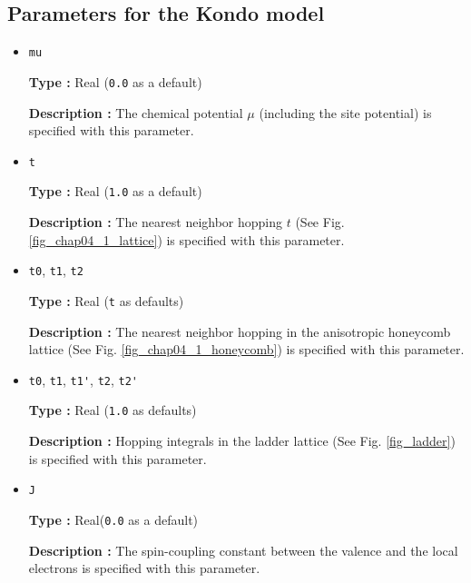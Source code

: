 \subsection{Parameters for the Kondo model}
\begin{itemize}
\item \verb|mu|

{\bf Type :} Real (\verb|0.0| as a default)

{\bf Description :} The chemical potential $\mu$ (including the site potential)
is specified with this parameter.

\item \verb|t|

{\bf Type :} Real (\verb|1.0| as a default)

{\bf Description :} The nearest neighbor hopping $t$ (See Fig. \ref{fig_chap04_1_lattice})
is specified with this parameter.

\item \verb|t0|, \verb|t1|, \verb|t2|

{\bf Type :} Real (\verb|t| as defaults)

{\bf Description :} The nearest neighbor hopping 
in the anisotropic honeycomb lattice 
(See Fig. \ref{fig_chap04_1_honeycomb})
is specified with this parameter.

\item \verb|t0|, \verb|t1|, \verb|t1'|, \verb|t2|, \verb|t2'|

{\bf Type :} Real (\verb|1.0| as defaults)

{\bf Description :} Hopping integrals
in the ladder lattice 
(See Fig. \ref{fig_ladder})
is specified with this parameter.

\item \verb|J|

{\bf Type :} Real(\verb|0.0| as a default)

{\bf Description :} The spin-coupling constant between the valence and the local electrons
is specified with this parameter.

\end{itemize}

